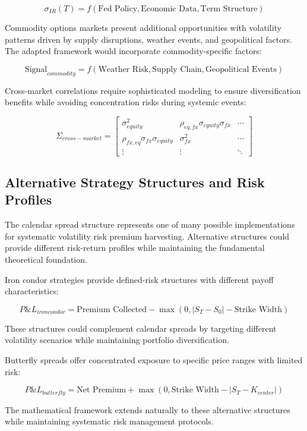 \documentclass[
  american,
  11pt,
  11pt,
  letterpaper,
  onecolumn]{article}
\begin{document}
\[\sigma_{IR}(T) = f(\text{Fed Policy}, \text{Economic Data}, \text{Term Structure})\]

Commodity options markets present additional opportunities with
volatility patterns driven by supply disruptions, weather events, and
geopolitical factors. The adapted framework would incorporate
commodity-specific factors:

\[\text{Signal}_{commodity} = f(\text{Weather Risk}, \text{Supply Chain}, \text{Geopolitical Events})\]

Cross-market correlations require sophisticated modeling to ensure
diversification benefits while avoiding concentration risks during
systemic events:

\[\Sigma_{cross-market} = \begin{bmatrix}
\sigma_{equity}^2 & \rho_{eq,fx}\sigma_{equity}\sigma_{fx} & \cdots \\
\rho_{fx,eq}\sigma_{fx}\sigma_{equity} & \sigma_{fx}^2 & \cdots \\
\vdots & \vdots & \ddots
\end{bmatrix}\]

\subsection{Alternative Strategy Structures and Risk
Profiles}\label{alternative-strategy-structures-and-risk-profiles}

The calendar spread structure represents one of many possible
implementations for systematic volatility risk premium harvesting.
Alternative structures could provide different risk-return profiles
while maintaining the fundamental theoretical foundation.

Iron condor strategies provide defined-risk structures with different
payoff characteristics:

\[P\&L_{iron condor} = \text{Premium Collected} - \max(0, |S_T - S_0| - \text{Strike Width})\]

These structures could complement calendar spreads by targeting
different volatility scenarios while maintaining portfolio
diversification.

Butterfly spreads offer concentrated exposure to specific price ranges
with limited risk:

\[P\&L_{butterfly} = \text{Net Premium} + \max(0, \text{Strike Width} - |S_T - K_{center}|)\]

The mathematical framework extends naturally to these alternative
structures while maintaining systematic risk management protocols.
\end{document}
